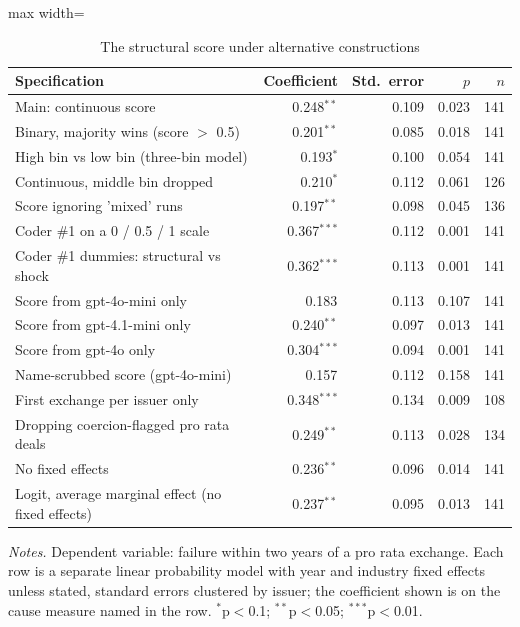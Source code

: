 \begin{table}[htbp]
\centering
\caption{The structural score under alternative constructions}
\label{tab:robust}
\small
\begin{adjustbox}{max width=\textwidth}
\begin{tabular}{l r r r r}
\toprule
Specification & Coefficient & Std.\ error & $p$ & $n$ \\
\midrule
Main: continuous score & 0.248$^{**}$ & 0.109 & 0.023 & 141 \\
\addlinespace
Binary, majority wins (score $>$ 0.5) & 0.201$^{**}$ & 0.085 & 0.018 & 141 \\
High bin vs low bin (three-bin model) & 0.193$^{*}$ & 0.100 & 0.054 & 141 \\
Continuous, middle bin dropped & 0.210$^{*}$ & 0.112 & 0.061 & 126 \\
Score ignoring 'mixed' runs & 0.197$^{**}$ & 0.098 & 0.045 & 136 \\
\addlinespace
Coder \#1 on a 0 / 0.5 / 1 scale & 0.367$^{***}$ & 0.112 & 0.001 & 141 \\
Coder \#1 dummies: structural vs shock & 0.362$^{***}$ & 0.113 & 0.001 & 141 \\
\addlinespace
Score from gpt-4o-mini only & 0.183$^{}$ & 0.113 & 0.107 & 141 \\
Score from gpt-4.1-mini only & 0.240$^{**}$ & 0.097 & 0.013 & 141 \\
Score from gpt-4o only & 0.304$^{***}$ & 0.094 & 0.001 & 141 \\
Name-scrubbed score (gpt-4o-mini) & 0.157$^{}$ & 0.112 & 0.158 & 141 \\
\addlinespace
First exchange per issuer only & 0.348$^{***}$ & 0.134 & 0.009 & 108 \\
Dropping coercion-flagged pro rata deals & 0.249$^{**}$ & 0.113 & 0.028 & 134 \\
No fixed effects & 0.236$^{**}$ & 0.096 & 0.014 & 141 \\
Logit, average marginal effect (no fixed effects) & 0.237$^{**}$ & 0.095 & 0.013 & 141 \\
\bottomrule
\end{tabular}
\end{adjustbox}
\begin{minipage}{0.95\textwidth}\vspace{4pt}\footnotesize
\textit{Notes.} Dependent variable: failure within two years of a pro rata exchange. Each row is a separate linear probability model with year and industry fixed effects unless stated, standard errors clustered by issuer; the coefficient shown is on the cause measure named in the row. $^{*}$p$<$0.1; $^{**}$p$<$0.05; $^{***}$p$<$0.01.
\end{minipage}
\end{table}
